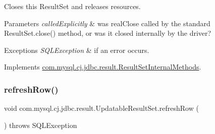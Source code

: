 Closes this Result\+Set and releases resources.


\begin{DoxyParams}{Parameters}
{\em called\+Explicitly} & was real\+Close called by the standard Result\+Set.\+close() method, or was it closed internally by the driver?\\
\hline
\end{DoxyParams}

\begin{DoxyExceptions}{Exceptions}
{\em S\+Q\+L\+Exception} & if an error occurs. \\
\hline
\end{DoxyExceptions}


Implements \mbox{\hyperlink{interfacecom_1_1mysql_1_1cj_1_1jdbc_1_1result_1_1_result_set_internal_methods_a0102042bd0710772308db537f40e2286}{com.\+mysql.\+cj.\+jdbc.\+result.\+Result\+Set\+Internal\+Methods}}.

\mbox{\label{classcom_1_1mysql_1_1cj_1_1jdbc_1_1result_1_1_updatable_result_set_abbdb6496de2649e552a76ebbd991c51a}} 
\subsubsection{\texorpdfstring{refresh\+Row()}{refreshRow()}}
{\footnotesize\ttfamily void com.\+mysql.\+cj.\+jdbc.\+result.\+Updatable\+Result\+Set.\+refresh\+Row (\begin{DoxyParamCaption}{ }\end{DoxyParamCaption}) throws S\+Q\+L\+Exception}

\mbox{\label{classcom_1_1mysql_1_1cj_1_1jdbc_1_1result_1_1_updatable_result_set_a0eb56ce5c9b20cf4861f3222dc2ee630}} 
